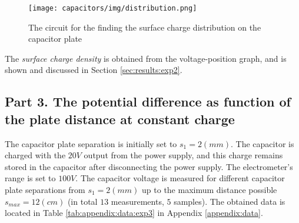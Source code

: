 \begin{figure}[H]
  \centering
  \texttt{[image: capacitors/img/distribution.png]}
  \caption{The circuit for the finding the surface charge distribution on the capacitor plate}
  \label{methods:fig:distribution}
\end{figure}

The \textit{surface charge density} is obtained from the voltage-position graph, and is shown and discussed in Section \ref{sec:results:exp2}.

\subsection{Part 3. The potential difference as function of the plate distance at constant charge} \label{sec:methods:exp3}

The capacitor plate separation is initially set to $s_{1} = 2 (mm)$. The capacitor is charged with the $20V$ output from the power supply, and this charge remains stored in the capacitor after disconnecting the power supply. The electrometer's range is set to $100V$. The capacitor voltage is measured for different capacitor plate separations from $s_{1} = 2 (mm)$ up to the maximum distance possible $s_{max} = 12 (cm)$ (in total $13$ measurements, $5$ samples). The obtained data is located in Table \ref{tab:appendix:data:exp3} in Appendix \ref{appendix:data}.
